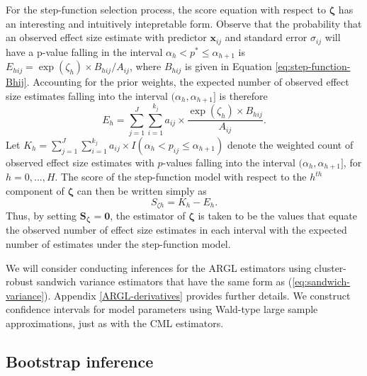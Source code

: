 \documentclass[
  man, donotrepeattitle,floatsintext]{apa7}
\begin{document}
For the step-function selection process, the score equation with respect to \(\boldsymbol\zeta\) has an interesting and intuitively intepretable form.
Observe that the probability that an observed effect size estimate with predictor \(\mathbf{x}_{ij}\) and standard error \(\sigma_{ij}\) will have a p-value falling in the interval \(\alpha_h < p^* \leq \alpha_{h+1}\) is \(E_{hij} = \exp(\zeta_h) \times B_{hij} / A_{ij}\), where \(B_{hij}\) is given in Equation \eqref{eq:step-function-Bhij}.
Accounting for the prior weights, the expected number of observed effect size estimates falling into the interval \((\alpha_h, \alpha_{h+1}]\) is therefore
\begin{equation}
\label{eq:expected-h}
E_h = \sum_{j=1}^J \sum_{i=1}^{k_j} a_{ij} \times \frac{\exp(\zeta_h) \times B_{hij}}{A_{ij}}.
\end{equation}
Let \(K_h = \sum_{j=1}^J \sum_{i=1}^{k_j} a_{ij} \times I\left(\alpha_h < p_{ij} \leq \alpha_{h+1}\right)\) denote the weighted count of observed effect size estimates with \(p\)-values falling into the interval \((\alpha_h, \alpha_{h+1}]\), for \(h = 0,...,H\).
The score of the step-function model with respect to the \(h^{th}\) component of \(\boldsymbol\zeta\) can then be written simply as
\begin{equation}
S_{\zeta h} = K_h - E_h.
\end{equation}
Thus, by setting \(\mathbf{S}_{\boldsymbol\zeta} = \mathbf{0}\), the estimator of \(\boldsymbol\zeta\) is taken to be the values that equate the observed number of effect size estimates in each interval with the expected number of estimates under the step-function model.

We will consider conducting inferences for the ARGL estimators using cluster-robust sandwich variance estimators that have the same form as (\ref{eq:sandwich-variance}).
Appendix \ref{ARGL-derivatives} provides further details.
We construct confidence intervals for model parameters using Wald-type large sample approximations, just as with the CML estimators.

\subsection{Bootstrap inference}\label{bootstrap-inference}
\end{document}
